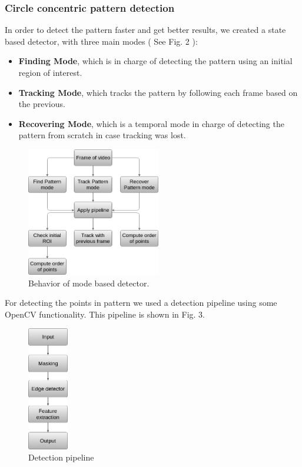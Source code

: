\documentclass[journal]{IEEEtran}
\begin{document}
\subsubsection{ \textbf{Circle concentric pattern detection} }
In order to detect the pattern faster and get better results, we created a state based detector, with three main modes ( See Fig. 2 ): 
\\
\begin{itemize}
  \item \textbf{Finding Mode}, which is in charge of detecting the pattern using an initial region of interest.
  \item \textbf{Tracking Mode}, which tracks the pattern by following each frame based on the previous.
  \item \textbf{Recovering Mode}, which is a temporal mode in charge of detecting the pattern from scratch in case tracking was lost.
\end{itemize}

\begin{figure}[H]
\centering
\includegraphics[width=2.3in]{_img/img_report4_pipeline_modes.png}
\caption{Behavior of mode based detector.}
\end{figure}

For detecting the points in pattern we used a detection pipeline using some OpenCV functionality. This pipeline is shown in Fig. 3.

\begin{figure}[H]
\centering
\includegraphics[width=0.7in]{_img/img_report4_pipeline_detector.png}
\caption{Detection pipeline}
\end{figure}
\end{document}
